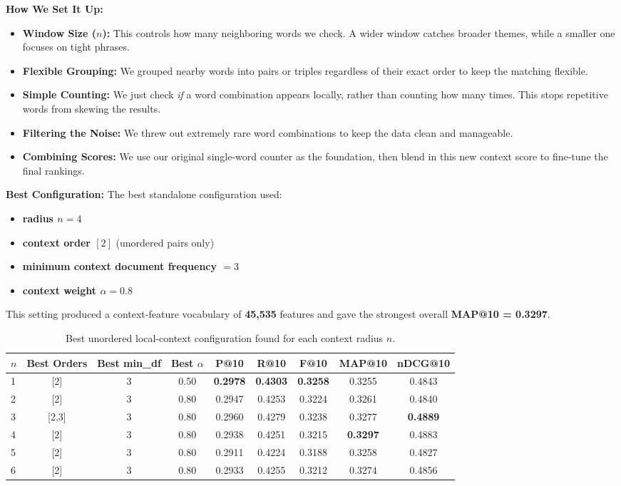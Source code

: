 \documentclass[runningheads]{llncs}
\begin{document}
\textbf{How We Set It Up:}
\begin{itemize}
    \item \textbf{Window Size ($n$):} This controls how many neighboring words we check. A wider window catches broader themes, while a smaller one focuses on tight phrases.
    \item \textbf{Flexible Grouping:} We grouped nearby words into pairs or triples regardless of their exact order to keep the matching flexible. 
    \item \textbf{Simple Counting:} We just check \textit{if} a word combination appears locally, rather than counting how many times. This stops repetitive words from skewing the results.
    \item \textbf{Filtering the Noise:} We threw out extremely rare word combinations to keep the data clean and manageable.
    \item \textbf{Combining Scores:} We use our original single-word counter as the foundation, then blend in this new context score to fine-tune the final rankings.
\end{itemize}

\textbf{Best Configuration:}
The best standalone configuration used:
\begin{itemize}[noitemsep]
    \item \textbf{radius $n=4$}
    \item \textbf{context order $[2]$} (unordered pairs only)
    \item \textbf{minimum context document frequency $=3$}
    \item \textbf{context weight $\alpha=0.8$}
\end{itemize}
This setting produced a context-feature vocabulary of \textbf{45,535} features and gave the strongest overall \textbf{MAP@10 = 0.3297}.

\begin{table}[h]
\centering
\small
\begin{tabular}{lcccccccc}
\toprule
\textbf{$n$} & \textbf{Best Orders} & \textbf{Best min\_df} & \textbf{Best $\alpha$} & \textbf{P@10} & \textbf{R@10} & \textbf{F@10} & \textbf{MAP@10} & \textbf{nDCG@10} \\
\midrule
1 & [2]   & 3 & 0.50 & \textbf{0.2978} & \textbf{0.4303} & \textbf{0.3258} & 0.3255 & 0.4843 \\
2 & [2]   & 3 & 0.80 & 0.2947 & 0.4253 & 0.3224 & 0.3261 & 0.4840 \\
3 & [2,3] & 3 & 0.80 & 0.2960 & 0.4279 & 0.3238 & 0.3277 & \textbf{0.4889} \\
4 & [2]   & 3 & 0.80 & 0.2938 & 0.4251 & 0.3215 & \textbf{0.3297} & 0.4883 \\
5 & [2]   & 3 & 0.80 & 0.2911 & 0.4224 & 0.3188 & 0.3258 & 0.4827 \\
6 & [2]   & 3 & 0.80 & 0.2933 & 0.4255 & 0.3212 & 0.3274 & 0.4856 \\
\bottomrule
\end{tabular}
\caption{Best unordered local-context configuration found for each context radius $n$.}
\label{tab:unordered_context_sweep}
\end{table}
\end{document}
